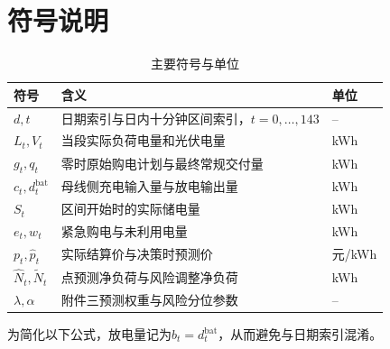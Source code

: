 \section{符号说明}
\begin{table}[htbp]
\centering
\renewcommand{\arraystretch}{1.38}
\caption{主要符号与单位}\label{tab:symbols}
\begin{tabularx}{\textwidth}{lXl}
\toprule 符号 & 含义 & 单位\\\midrule
$d,t$ & 日期索引与日内十分钟区间索引，$t=0,\ldots,143$ & --\\
$L_t,V_t$ & 当段实际负荷电量和光伏电量 & kWh\\
$g_t,q_t$ & 零时原始购电计划与最终常规交付量 & kWh\\
$c_t,d_t^{\mathrm{bat}}$ & 母线侧充电输入量与放电输出量 & kWh\\
$S_t$ & 区间开始时的实际储电量 & kWh\\
$e_t,w_t$ & 紧急购电与未利用电量 & kWh\\
$p_t,\widehat p_t$ & 实际结算价与决策时预测价 & 元/kWh\\
$\widehat N_t,\widetilde N_t$ & 点预测净负荷与风险调整净负荷 & kWh\\
$\lambda,\alpha$ & 附件三预测权重与风险分位参数 & --\\
\bottomrule
\end{tabularx}
\end{table}
为简化以下公式，放电量记为$b_t=d_t^{\mathrm{bat}}$，从而避免与日期索引混淆。
\FloatBarrier
